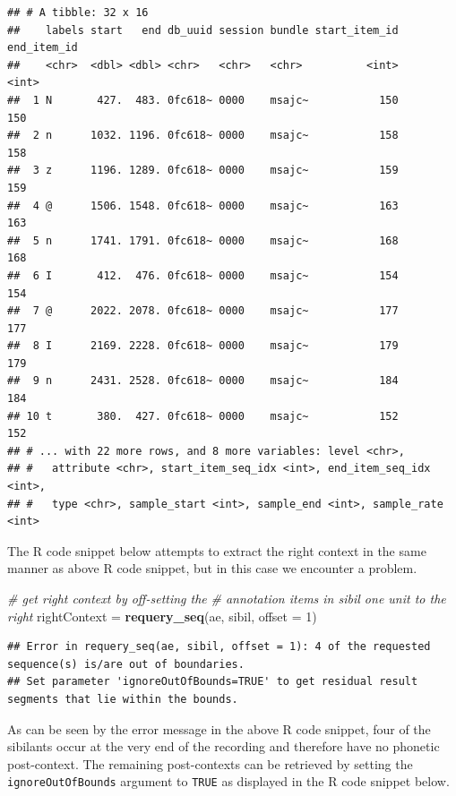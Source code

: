 \documentclass[]{book}
\newenvironment{Shaded}{\begin{snugshade}}{\end{snugshade}}
\newcommand{\CommentTok}[1]{\textcolor[rgb]{0.56,0.35,0.01}{\textit{#1}}}
\newcommand{\DataTypeTok}[1]{\textcolor[rgb]{0.13,0.29,0.53}{#1}}
\newcommand{\DecValTok}[1]{\textcolor[rgb]{0.00,0.00,0.81}{#1}}
\newcommand{\KeywordTok}[1]{\textcolor[rgb]{0.13,0.29,0.53}{\textbf{#1}}}
\newcommand{\NormalTok}[1]{#1}
\newcommand{\StringTok}[1]{\textcolor[rgb]{0.31,0.60,0.02}{#1}}
\begin{document}
\begin{verbatim}
## # A tibble: 32 x 16
##    labels start   end db_uuid session bundle start_item_id end_item_id
##    <chr>  <dbl> <dbl> <chr>   <chr>   <chr>          <int>       <int>
##  1 N       427.  483. 0fc618~ 0000    msajc~           150         150
##  2 n      1032. 1196. 0fc618~ 0000    msajc~           158         158
##  3 z      1196. 1289. 0fc618~ 0000    msajc~           159         159
##  4 @      1506. 1548. 0fc618~ 0000    msajc~           163         163
##  5 n      1741. 1791. 0fc618~ 0000    msajc~           168         168
##  6 I       412.  476. 0fc618~ 0000    msajc~           154         154
##  7 @      2022. 2078. 0fc618~ 0000    msajc~           177         177
##  8 I      2169. 2228. 0fc618~ 0000    msajc~           179         179
##  9 n      2431. 2528. 0fc618~ 0000    msajc~           184         184
## 10 t       380.  427. 0fc618~ 0000    msajc~           152         152
## # ... with 22 more rows, and 8 more variables: level <chr>,
## #   attribute <chr>, start_item_seq_idx <int>, end_item_seq_idx <int>,
## #   type <chr>, sample_start <int>, sample_end <int>, sample_rate <int>
\end{verbatim}

The R code snippet below attempts to extract the right context in the same manner as above R code snippet, but in this case we encounter a problem.

\begin{Shaded}
\begin{Highlighting}[]
\CommentTok{# get right context by off-setting the }
\CommentTok{# annotation items in sibil one unit to the right}
\NormalTok{rightContext =}\StringTok{ }\KeywordTok{requery_seq}\NormalTok{(ae, sibil, }\DataTypeTok{offset =} \DecValTok{1}\NormalTok{)}
\end{Highlighting}
\end{Shaded}

\begin{verbatim}
## Error in requery_seq(ae, sibil, offset = 1): 4 of the requested sequence(s) is/are out of boundaries.
## Set parameter 'ignoreOutOfBounds=TRUE' to get residual result segments that lie within the bounds.
\end{verbatim}

As can be seen by the error message in the above R code snippet, four of the sibilants occur at the very end of the recording and therefore have no phonetic post-context. The remaining post-contexts can be retrieved by setting the \texttt{ignoreOutOfBounds} argument to \texttt{TRUE} as displayed in the R code snippet below.
\end{document}
